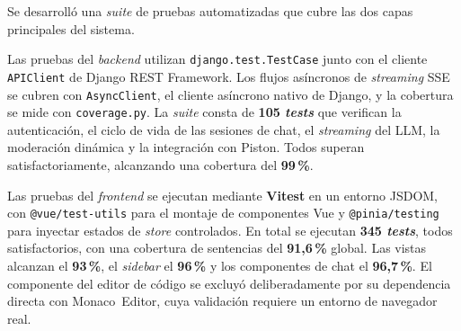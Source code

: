 Se desarrolló una \textit{suite} de pruebas automatizadas que cubre las dos capas principales del sistema.

Las pruebas del \textit{backend} utilizan \texttt{django.test.TestCase} junto con el cliente \texttt{APIClient} de Django REST Framework. Los flujos asíncronos de \textit{streaming} SSE se cubren con \texttt{AsyncClient}, el cliente asíncrono nativo de Django, y la cobertura se mide con \texttt{coverage.py}. La \textit{suite} consta de \textbf{105 \textit{tests}} que verifican la autenticación, el ciclo de vida de las sesiones de chat, el \textit{streaming} del LLM, la moderación dinámica y la integración con Piston. Todos superan satisfactoriamente, alcanzando una cobertura del \textbf{99\,\%}.

Las pruebas del \textit{frontend} se ejecutan mediante \textbf{Vitest} en un entorno JSDOM, con \texttt{@vue/test-utils} para el montaje de componentes Vue y \texttt{@pinia/testing} para inyectar estados de \textit{store} controlados. En total se ejecutan \textbf{345 \textit{tests}}, todos satisfactorios, con una cobertura de sentencias del \textbf{91,6\,\%} global. Las vistas alcanzan el \textbf{93\,\%}, el \textit{sidebar} el \textbf{96\,\%} y los componentes de chat el \textbf{96,7\,\%}. El componente del editor de código se excluyó deliberadamente por su dependencia directa con Monaco~Editor, cuya validación requiere un entorno de navegador real.
